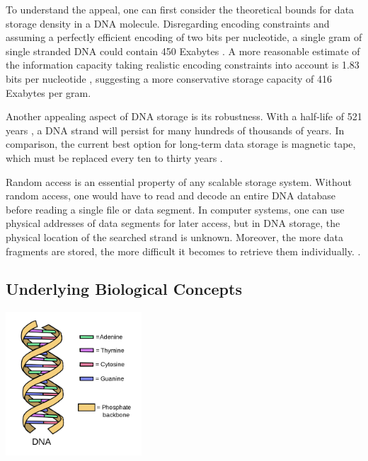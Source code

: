 \documentclass[a4paper,conference]{IEEEtran}
\begin{document}
To understand the appeal, one can first consider the theoretical bounds for data storage density in a DNA molecule. Disregarding encoding constraints and assuming a perfectly efficient encoding of two bits per nucleotide, a single gram of single stranded DNA could contain 450 Exabytes \cite{theoreticaldensity}. A more reasonable estimate of the information capacity taking realistic encoding constraints into account is 1.83 bits per nucleotide \cite{realistictheoreticaldensity}, suggesting a more conservative storage capacity of 416 Exabytes per gram. 


Another appealing aspect of DNA storage is its robustness. With a half-life of 521 years \cite{dnabasedarchival}, a DNA strand will persist for many hundreds of thousands of years. In comparison, the current best option for long-term data storage is magnetic tape, which must be replaced every ten to thirty years \cite{dnabasedarchival}.


Random access is an essential property of any scalable storage system. Without random access, one would have to read and decode an entire DNA database before reading a single file or data segment. In computer systems, one can use physical addresses of data segments for later access, but in DNA storage, the physical location of the searched strand is unknown. Moreover, the more data fragments are stored, the more difficult it becomes to retrieve them individually. \cite{dnabasedarchival}.


 

\subsection{Underlying Biological Concepts}

\begin{center}
\includegraphics[width=2in]{dna}
\end{center}
\end{document}
